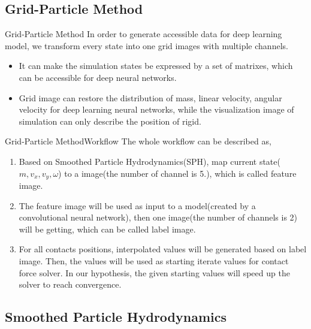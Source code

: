 \documentclass{beamer}
\begin{document}
\subsection{Grid-Particle Method}
\begin{frame}{Grid-Particle Method}
In order to generate accessible data for deep learning model, we transform every state into one grid images with multiple channels.
\pause
\begin{itemize}
\item {It can make the simulation states be expressed by a set of matrixes, which can be accessible for deep neural networks.}
    \pause
\item Grid image can restore the distribution of mass, linear velocity, angular velocity for deep learning neural networks, while the visualization image of simulation can only describe the position of rigid.
\end{itemize}
\end{frame}
\begin{frame}{Grid-Particle Method}{Workflow}
The whole workflow can be described as,
\pause
\begin{enumerate}
\item {
Based on Smoothed Particle Hydrodynamics(SPH), map current state(\(m, v_x, v_y, \omega\)) to a image(the number of channel is 5.), which is called feature image.
\pause
}
\item {
The feature image will be used as input to a model(created by a convolutional neural network), then one image(the number of channels is 2) will be getting, which can be called label image.
\pause
}
\item {
For all contacts positions, interpolated values will be generated based on label image. Then, the values will be used as starting iterate values for contact force solver. In our hypothesis, the given starting values will speed up the solver to reach convergence.
}

\end{enumerate}
\end{frame}
\subsection{Smoothed Particle Hydrodynamics}
\end{document}
